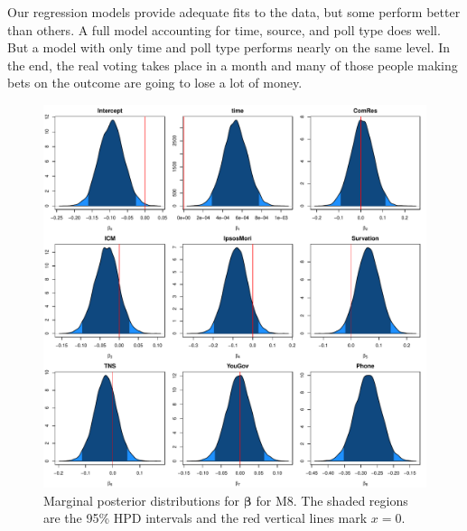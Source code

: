\documentclass{asaproc}
\newcommand{\m}[1]{\mathbf{\bm{#1}}}
\begin{document}
Our regression models provide adequate fits to the data, but some perform better than others. A full model accounting for time, source, and poll type does well. But a model with only time and poll type performs nearly on the same level. In the end, the real voting takes place in a month and many of those people making bets on the outcome are going to lose a lot of money.

\begin{figure}
\centering
\includegraphics[scale=0.35]{figs/post.pdf}
\caption{Marginal posterior distributions for $\m{\beta}$ for M8. The shaded regions are the 95\% HPD intervals and the red vertical lines mark $x=0$.}
\label{post}
\end{figure}
\end{document}
